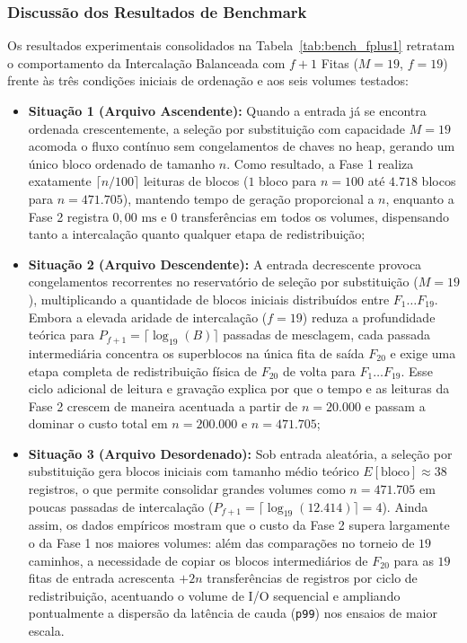 \documentclass[12pt,a4paper]{article}
\begin{document}
\subsubsection{Discussão dos Resultados de Benchmark}
Os resultados experimentais consolidados na Tabela~\ref{tab:bench_fplus1} retratam o comportamento da Intercalação Balanceada com $f+1$ Fitas ($M = 19$, $f = 19$) frente às três condições iniciais de ordenação e aos seis volumes testados:
\begin{itemize}
    \item \textbf{Situação 1 (Arquivo Ascendente):} Quando a entrada já se encontra ordenada crescentemente, a seleção por substituição com capacidade $M = 19$ acomoda o fluxo contínuo sem congelamentos de chaves no heap, gerando um único bloco ordenado de tamanho $n$. Como resultado, a Fase 1 realiza exatamente $\lceil n / 100 \rceil$ leituras de blocos ($1$ bloco para $n = 100$ até $4.718$ blocos para $n = 471.705$), mantendo tempo de geração proporcional a $n$, enquanto a Fase 2 registra $0{,}00\text{ ms}$ e $0$ transferências em todos os volumes, dispensando tanto a intercalação quanto qualquer etapa de redistribuição;
    \item \textbf{Situação 2 (Arquivo Descendente):} A entrada decrescente provoca congelamentos recorrentes no reservatório de seleção por substituição ($M = 19$), multiplicando a quantidade de blocos iniciais distribuídos entre $F_1 \dots F_{19}$. Embora a elevada aridade de intercalação ($f = 19$) reduza a profundidade teórica para $P_{f+1} = \lceil \log_{19}(B) \rceil$ passadas de mesclagem, cada passada intermediária concentra os superblocos na única fita de saída $F_{20}$ e exige uma etapa completa de redistribuição física de $F_{20}$ de volta para $F_1 \dots F_{19}$. Esse ciclo adicional de leitura e gravação explica por que o tempo e as leituras da Fase 2 crescem de maneira acentuada a partir de $n = 20.000$ e passam a dominar o custo total em $n = 200.000$ e $n = 471.705$;
    \item \textbf{Situação 3 (Arquivo Desordenado):} Sob entrada aleatória, a seleção por substituição gera blocos iniciais com tamanho médio teórico $E[\text{bloco}] \approx 38$ registros, o que permite consolidar grandes volumes como $n = 471.705$ em poucas passadas de intercalação ($P_{f+1} = \lceil \log_{19}(12.414) \rceil = 4$). Ainda assim, os dados empíricos mostram que o custo da Fase 2 supera largamente o da Fase 1 nos maiores volumes: além das comparações no torneio de $19$ caminhos, a necessidade de copiar os blocos intermediários de $F_{20}$ para as $19$ fitas de entrada acrescenta $+2n$ transferências de registros por ciclo de redistribuição, acentuando o volume de I/O sequencial e ampliando pontualmente a dispersão da latência de cauda (\texttt{p99}) nos ensaios de maior escala.
\end{itemize}
\end{document}

